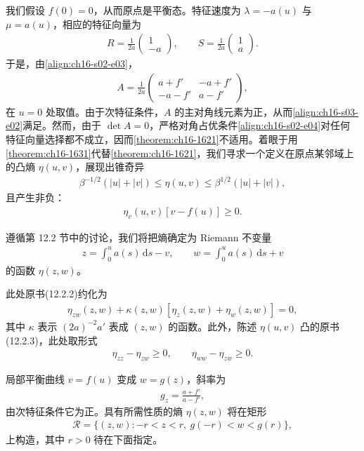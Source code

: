 \documentclass[../../main.tex]{subfiles}
\begin{document}
我们假设 $f(0)=0$，从而原点是平衡态。特征速度为 $\lambda=-a(u)$ 与 $\mu=a(u)$，相应的特征向量为
\begin{align}
R=\frac{1}{2a}\begin{pmatrix}1\\-a\end{pmatrix},\qquad S=\frac{1}{2a}\begin{pmatrix}1\\a\end{pmatrix}.
\label{align:ch16-s05-e03}
\end{align}
于是，由\eqref{align:ch16-s02-e03}，
\begin{align}
A=\frac{1}{2a}\begin{pmatrix}a+f'&-a+f'\\-a-f'&a-f'\end{pmatrix},
\label{align:ch16-s05-e04}
\end{align}
在 $u=0$ 处取值。由于次特征条件，$A$ 的主对角线元素为正，从而\eqref{align:ch16-s03-e02}满足。然而，由于 $\det A=0$，严格对角占优条件\eqref{align:ch16-s02-e04}对任何特征向量选择都不成立，因而\cref{theorem:ch16-1621}不适用。着眼于用\cref{theorem:ch16-1631}代替\cref{theorem:ch16-1621}，我们寻求一个定义在原点某邻域上的凸熵 $\eta(u,v)$，展现出锥奇异
\begin{align}
\beta^{-1/2}(|u|+|v|)\leqslant\eta(u,v)\leqslant\beta^{1/2}(|u|+|v|),
\label{align:ch16-s05-e05}
\end{align}
且产生非负：
\begin{align}
\eta_v(u,v)[v-f(u)]\geqslant0.
\label{align:ch16-s05-e06}
\end{align}

遵循第 12.2 节中的讨论，我们将把熵确定为 Riemann 不变量
\begin{align}
z=\int_0^u a(s)\,\mathrm{d}s-v,\qquad w=\int_0^u a(s)\,\mathrm{d}s+v
\label{align:ch16-s05-e07}
\end{align}
的函数 $\eta(z,w)$。

此处原书(12.2.2)约化为
\begin{align}
\eta_{zw}(z,w)+\kappa(z,w)[\eta_z(z,w)+\eta_w(z,w)]=0,
\label{align:ch16-s05-e08}
\end{align}
其中 $\kappa$ 表示 $(2a)^{-2}a'$ 表成 $(z,w)$ 的函数。此外，陈述 $\eta(u,v)$ 凸的原书(12.2.3)，此处取形式
\begin{align}
\eta_{zz}-\eta_{zw}\geqslant0,\qquad\eta_{ww}-\eta_{zw}\geqslant0.
\label{align:ch16-s05-e09}
\end{align}

局部平衡曲线 $v=f(u)$ 变成 $w=g(z)$，斜率为
\begin{align}
g_z=\frac{a+f'}{a-f'},
\label{align:ch16-s05-e10}
\end{align}
由次特征条件它为正。具有所需性质的熵 $\eta(z,w) $ 将在矩形
\begin{align}
\mathscr{R}=\{(z,w):-r<z<r,\ g(-r)<w<g(r)\},
\label{align:ch16-s05-e11}
\end{align}
上构造，其中 $r>0$ 待在下面指定。
\end{document}
